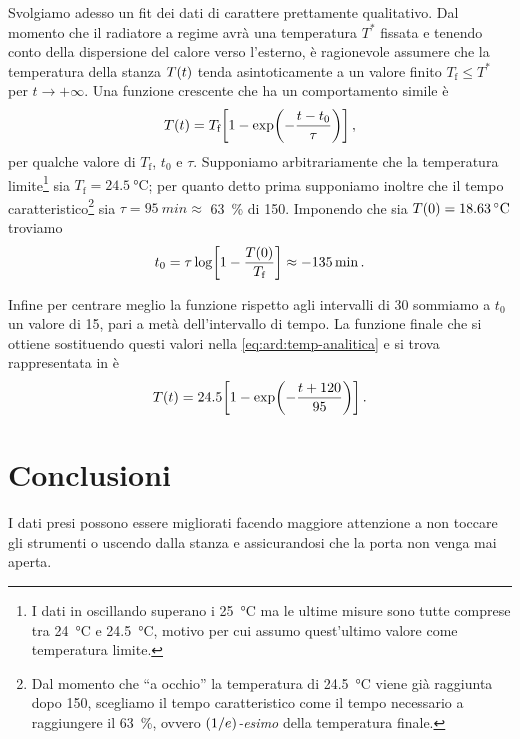             Svolgiamo adesso un fit dei dati di carattere prettamente qualitativo. Dal momento che il radiatore a regime avrà una temperatura $T^*$ fissata e tenendo conto della dispersione del calore verso l'esterno, è ragionevole assumere che la temperatura della stanza $T\pqty{t}$ tenda asintoticamente a un valore finito $T_\text{f} \leq T^*$ per $t\to+\infty$. Una funzione crescente che ha un comportamento simile è
            \begin{equation}
                T\pqty{t} = T_\text{f}\bqty{1 - \exp\!\pqty{-\frac{t - t_0}{\tau}}}
                \mycomma
                \label{eq:ard:temp-analitica}
            \end{equation}
            per qualche valore di $T_\text{f}$, $t_0$ e $\tau$. Supponiamo arbitrariamente che la temperatura limite\footnote{I dati in  oscillando superano i \SI{25}{\celsius} ma le ultime misure sono tutte comprese tra \SI{24}{\celsius} e \SI{24.5}{\celsius}, motivo per cui assumo quest'ultimo valore come temperatura limite.} sia $T_\text{f} = \SI{24.5}{\celsius}$; per quanto detto prima supponiamo inoltre che il tempo caratteristico\footnote{Dal momento che ``a occhio'' la temperatura di \SI{24.5}{\celsius} viene già raggiunta dopo \SI{150}{\min}, scegliamo il tempo caratteristico come il tempo necessario a raggiungere il \SI{63}{\%}, ovvero \textit{$\pqty{1/e}$-esimo} della temperatura finale.} sia $\tau = \SI{95}{min} \approx$ \SI{63}{\%} di \SI{150}{\min}. Imponendo che sia $T\pqty{0} = \SI{18.63}{\celsius}$ troviamo
            \begin{equation*}
                t_0
                = \tau \log\!\bqty{1-\frac{T\pqty{0}}{T_\text{f}}}
                \approx -\SI{135}{\min}
                \myperiod
            \end{equation*}

            Infine per centrare meglio la funzione rispetto agli intervalli di \SI{30}{\min} sommiamo a $t_0$ un valore di \SI{15}{\min}, pari a metà dell'intervallo di tempo. La funzione finale che si ottiene sostituendo questi valori nella \eqref{eq:ard:temp-analitica} e si trova rappresentata in  è
            \begin{equation}
                T\pqty{t} =  24.5 \bqty{1 - \exp\!\pqty{-\frac{t + 120}{95}}}
                \myperiod
                \label{eq:ard:temp-numerica}
            \end{equation}

    \section{Conclusioni}
        I dati presi possono essere migliorati facendo maggiore attenzione a non toccare gli strumenti o uscendo dalla stanza e assicurandosi che la porta non venga mai aperta.

